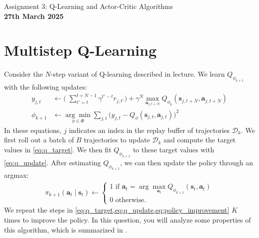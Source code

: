 \documentclass{article}
\begin{document}
\lstset{basicstyle = \ttfamily,columns=fullflexible,
breaklines = true,
frame = single,
language = bash
}

\begin{centering}
    {\Large Assignment 3: Q-Learning and Actor-Critic Algorithms} \\
    \vspace{.25cm}
    \textbf{27th March 2025} \\
\end{centering}

\section{Multistep Q-Learning}

\begingroup
\def\Q{Q_{\phi_k}}
\def\Qn{Q_{\phi_{k+1}}}
\def\D{\mathcal{D}}

Consider the $N$-step variant of Q-learning described in lecture. We learn $\Qn$ with the following updates:\begin{align}
  y_{j,t} &\gets \biggl(\;\sum_{t'=t}^{t+N-1} \gamma^{t'-t} r_{j,t'}\biggr)+\gamma^{N} \max _{\mathbf{a}_{j,t+N}} \Q\left(\mathbf{s}_{j,t+N}, \mathbf{a}_{j,t+N}\right) \label{eq:q_target}\\
  \phi_{k+1} &\gets \underset{\phi\in\Phi}{\arg\min}  \sum_{j,t} \bigl( y_{j,t}-Q_{\phi}(\mathbf s_{j,t},\mathbf a_{j,t}) \bigr)^2 \label{eq:q_update}
\end{align}
In these equations, $j$ indicates an index in the replay buffer of trajectories $\D_k$. We first roll out a batch of $B$ trajectories to update $\D_k$ and compute the target values in \eqref{eq:q_target}. We then fit $\Qn$ to these target values with \eqref{eq:q_update}. 
After estimating $\Qn$, we can then update the policy through an argmax:\begin{align}
  \pi_{k+1}\left(\mathbf{a}_{t} \mid \mathbf{s}_{t}\right)\gets \left\{\begin{array}{l}1 \text { if } \mathbf{a}_{t}=\arg \max _{\mathbf{a}_{t}} Q_{\phi_{k+1}}\left(\mathbf{s}_{t}, \mathbf{a}_{t}\right) \\ 0 \text{ otherwise. }\end{array}\right. \label{eq:policy_improvement}
\end{align}
We repeat the steps in \cref{eq:q_target,eq:q_update,eq:policy_improvement} $K$ times to improve the policy. In this question, you will analyze some properties of this algorithm, which is summarized in .
\end{document}
